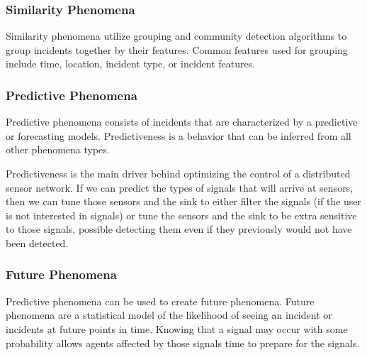 \subsubsection{Similarity Phenomena}
Similarity phenomena utilize grouping and community detection algorithms to group incidents together by their features. Common features used for grouping include time, location, incident type, or incident features.


\subsubsection{Predictive Phenomena}
Predictive phenomena consists of incidents that are characterized by a predictive or forecasting models. Predictiveness is a behavior that can be inferred from all other phenomena types. 

Predictiveness is the main driver behind optimizing the control of a distributed sensor network. If we can predict the types of signals that will arrive at sensors, then we can tune those sensors and the sink to either filter the signals (if the user is not interested in signals) or tune the sensors and the sink to be extra sensitive to those signals, possible detecting them even if they previously would not have been detected.

\subsubsection{Future Phenomena}
Predictive phenomena can be used to create future phenomena. Future phenomena are a statistical model of the likelihood of seeing an incident or incidents at future points in time. Knowing that a signal may occur with some probability allows agents affected by those signals time to prepare for the signals.

